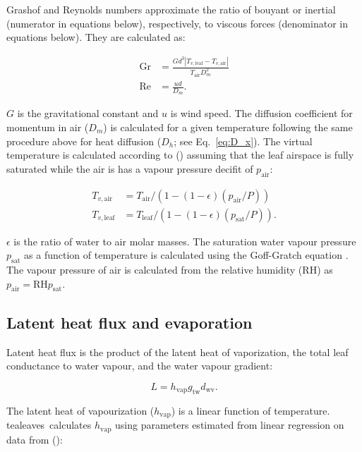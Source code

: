\documentclass[11pt, oneside]{article}
\newcommand{\pkg}[1]{{\fontseries{b}\selectfont #1}}
\newcommand{\tealeaves}{\pkg{tealeaves}}
\begin{document}
Grashof and Reynolds numbers approximate the ratio of bouyant or inertial (numerator in equations below), respectively, to viscous forces (denominator in equations below). They are calculated as:

\begin{align} \label{eq:GrRe}
  \mathrm{Gr} & = \frac{G d ^ 3 |T_{v,\mathrm{leaf}} - T_{v,\mathrm{air}}|}{T_\mathrm{air} D_m ^ 2} \\
  \mathrm{Re} & = \frac{u d}{D_m}.
\end{align}

$G$ is the gravitational constant and $u$ is wind speed. The diffusion coefficient for momentum in air ($D_m$) is calculated for a given temperature following the same procedure above for heat diffusion ($D_h$; see Eq.~\ref{eq:D_x}). The virtual temperature is calculated according to \citeauthor{Monteith_Unsworth_2013} (\citeyear{Monteith_Unsworth_2013}) assuming that the leaf airspace is fully saturated while the air is has a vapour pressure decifit of $p_\mathrm{air}$:

\begin{align} \label{eq:Tv}
  T_{v, \mathrm{air}} & = T_\mathrm{air} / (1 - (1 - \epsilon) (p_\mathrm{air} / P)) \\
  T_{v, \mathrm{leaf}} & = T_\mathrm{leaf} / (1 - (1 - \epsilon) (p_\mathrm{sat} / P)).
\end{align}

$\epsilon$ is the ratio of water to air molar masses. The saturation water vapour pressure $p_\mathrm{sat}$ as a function of temperature is calculated using the Goff-Gratch equation \citep{Vomel_2016}. The vapour pressure of air is calculated from the relative humidity ($\mathrm{RH}$) as $p_\mathrm{air} = \mathrm{RH} p_\mathrm{sat}$.

\subsection*{Latent heat flux and evaporation}

Latent heat flux is the product of the latent heat of vaporization, the total leaf conductance to water vapour, and the water vapour gradient:

\begin{equation}
  L = h_\mathrm{vap} g_\mathrm{tw} d_\mathrm{wv}.
\end{equation}

The latent heat of vapourization ($h_\mathrm{vap}$) is a linear function of temperature. \tealeaves~calculates $h_\mathrm{vap}$ using parameters estimated from linear regression on data from \citeauthor{Nobel_2009} (\citeyear{Nobel_2009}):
\end{document}
